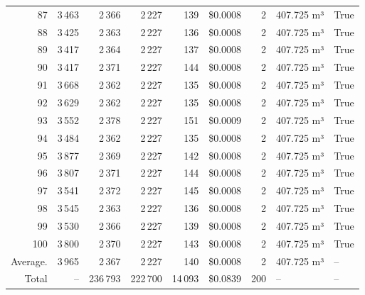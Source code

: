 \documentclass[a4paper,11pt]{article}
\begin{document}
\begin{table}[ht]
\begin{tabular}{r r r r r r r p{3cm} l}
87 & 3\,463 & 2\,366 & 2\,227 & 139 & \$0.0008 & 2 & 407.725 m³ & True \\
88 & 3\,425 & 2\,363 & 2\,227 & 136 & \$0.0008 & 2 & 407.725 m³ & True \\
89 & 3\,417 & 2\,364 & 2\,227 & 137 & \$0.0008 & 2 & 407.725 m³ & True \\
90 & 3\,417 & 2\,371 & 2\,227 & 144 & \$0.0008 & 2 & 407.725 m³ & True \\
91 & 3\,668 & 2\,362 & 2\,227 & 135 & \$0.0008 & 2 & 407.725 m³ & True \\
92 & 3\,629 & 2\,362 & 2\,227 & 135 & \$0.0008 & 2 & 407.725 m³ & True \\
93 & 3\,552 & 2\,378 & 2\,227 & 151 & \$0.0009 & 2 & 407.725 m³ & True \\
94 & 3\,484 & 2\,362 & 2\,227 & 135 & \$0.0008 & 2 & 407.725 m³ & True \\
95 & 3\,877 & 2\,369 & 2\,227 & 142 & \$0.0008 & 2 & 407.725 m³ & True \\
96 & 3\,807 & 2\,371 & 2\,227 & 144 & \$0.0008 & 2 & 407.725 m³ & True \\
97 & 3\,541 & 2\,372 & 2\,227 & 145 & \$0.0008 & 2 & 407.725 m³ & True \\
98 & 3\,545 & 2\,363 & 2\,227 & 136 & \$0.0008 & 2 & 407.725 m³ & True \\
99 & 3\,530 & 2\,366 & 2\,227 & 139 & \$0.0008 & 2 & 407.725 m³ & True \\
100 & 3\,800 & 2\,370 & 2\,227 & 143 & \$0.0008 & 2 & 407.725 m³ & True \\
\hline
Average. & 3\,965 & 2\,367 & 2\,227 & 140 & \$0.0008 & 2 & 407.725 m³ & -- \\
Total & -- & 236\,793 & 222\,700 & 14\,093 & \$0.0839 & 200 & -- & -- \\
\hline
\end{tabular}
\end{table}

\clearpage
\end{document}
